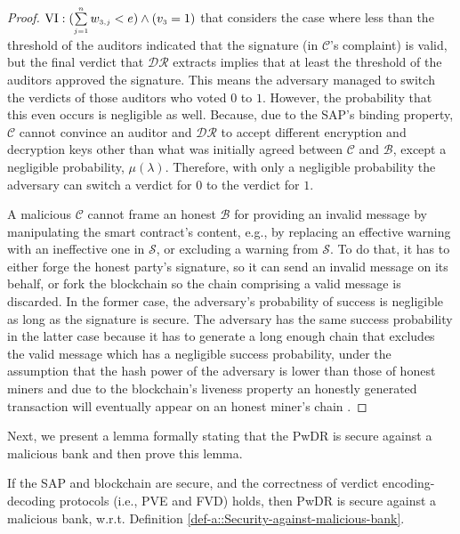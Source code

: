 \begin{proof}
 $\text{\MakeUppercase{\romannumeral 6}}:(\sum\limits_{\st j=1}^{\st n}w_{\st 3,j}< {e}) \wedge ( {v}_{\st 3}=1)$ that considers the case where less than the threshold of the auditors indicated that the signature (in $\mathcal{C}$'s complaint) is valid, but   the final verdict that $\mathcal{DR}$ extracts implies that at least the threshold of the auditors approved the signature. This means the adversary managed to switch the verdicts of those auditors who voted $0$ to $1$. However, the probability that this even occurs is negligible as well. Because, due to the SAP's binding property,  $\mathcal{C}$ cannot convince an auditor and $\mathcal{DR}$ to accept different encryption and decryption keys other than what was initially agreed between $\mathcal{C}$ and $\mathcal{B}$, except a negligible probability, $\mu(\lambda)$.  Therefore, with only a negligible probability the adversary can switch a verdict for $0$ to the verdict for $1$. 
 
 
A malicious $\mathcal{C}$ cannot frame an honest $\mathcal{B}$ for providing an invalid message by manipulating the smart contract’s content,  e.g., by replacing an effective warning with an ineffective one in $\mathcal{S}$, or excluding a warning from $\mathcal{S}$. To do that, it has to either forge the honest party’s signature, so it can send an invalid message on its behalf, or fork the blockchain so the chain comprising a valid message is discarded. In the former case, the adversary’s probability of success is negligible as long as the signature is secure. The adversary has the same success probability in the latter case because it has to generate a long enough chain that excludes the valid message which has a negligible success probability, under the assumption that the hash power of the adversary is lower than those of honest miners and due to the blockchain’s liveness property an honestly generated transaction will eventually appear on an honest miner’s chain \cite{GarayKL15}. 
\end{proof}

\vspace{-3mm}


Next, we present a lemma formally stating that the PwDR is secure against a malicious bank and then prove this lemma. 

\vspace{-2mm}
\begin{lemma}\label{lemma::secure-against-a-malicious-bank} If the  SAP and blockchain are secure, and the correctness of verdict encoding-decoding protocols (i.e., PVE and FVD) holds, then PwDR is secure against a malicious bank, w.r.t. Definition \ref{def-a::Security-against-malicious-bank}. 
\end{lemma}


